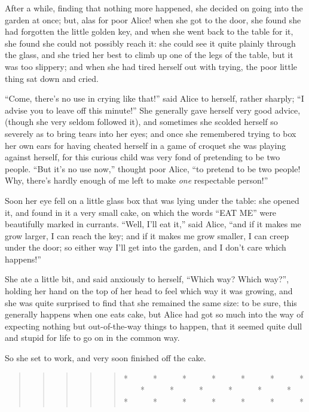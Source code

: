 \documentclass[11pt,openany,oneside]{book}
\begin{document}
After a while, finding that nothing more happened, she decided on going into the garden at once; but, alas for poor Alice! when she got to the door, she found she had forgotten the little golden key, and when she went back to the table for it, she found she could not possibly reach it: she could see it quite plainly through the glass, and she tried her best to climb up one of the legs of the table, but it was too slippery; and when she had tired herself out with trying, the poor little thing sat down and cried. 

“Come, there’s no use in crying like that!” said Alice to herself, rather sharply; “I advise you to leave off this minute!” She generally gave herself very good advice, (though she very seldom followed it), and sometimes she scolded herself so severely as to bring tears into her eyes; and once she remembered trying to box her own ears for having cheated herself in a game of croquet she was playing against herself, for this curious child was very fond of pretending to be two people. “But it’s no use now,” thought poor Alice, “to pretend to be two people! Why, there’s hardly enough of me left to make {\em one\/} respectable person!” 

Soon her eye fell on a little glass box that was lying under the table: she opened it, and found in it a very small cake, on which the words “EAT ME” were beautifully marked in currants. “Well, I’ll eat it,” said Alice, “and if it makes me grow larger, I can reach the key; and if it makes me grow smaller, I can creep under the door; so either way I’ll get into the garden, and I don’t care which happens!” 

She ate a little bit, and said anxiously to herself, “Which way? Which way?”, holding her hand on the top of her head to feel which way it was growing, and she was quite surprised to find that she remained the same size: to be sure, this generally happens when one eats cake, but Alice had got so much into the way of expecting nothing but out-of-the-way things to happen, that it seemed quite dull and stupid for life to go on in the common way. 

So she set to work, and very soon finished off the cake. 

\begin{quote}
\begin{quote}
\begin{quote}
\begin{quote}
\begin{quote}
*~~~~~~*~~~~~~*~~~~~~*~~~~~~*~~~~~~*~~~~~~*\newline
 \newline
 ~~~~*~~~~~~*~~~~~~*~~~~~~*~~~~~~*~~~~~~*\newline
 \newline
 *~~~~~~*~~~~~~*~~~~~~*~~~~~~*~~~~~~*~~~~~~*

\end{quote}
\end{quote}
\end{quote}
\end{quote}
\end{quote}
\end{document}
